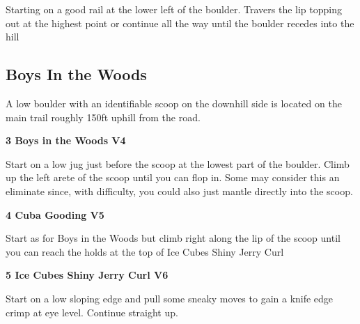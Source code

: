 \begin{multicols}{2}
\begin{minipage}{\linewidth}
					\begin{adjustwidth}{0.5cm}{}				
					Starting on a good rail at the lower left of the boulder. Travers the lip topping out at the highest point or continue all the way until the boulder recedes into the hill
					\end{adjustwidth}
					\end{minipage}
			\subsection*{Boys In the Woods}\label{bf:Boys In the Woods}
			\begin{minipage}{\columnwidth}
			A low boulder with an identifiable scoop on the downhill side is located on the main trail roughly 150ft uphill from the road.
			\end{minipage}
			

					\begin{minipage}{\linewidth}	
					\label{rt:Boys in the Woods}
\colorbox{RoyalBlue!20}{
\parbox{0.95\textwidth}{
\textbf{
3 Boys in the Woods V4    
}
}
}

					\begin{adjustwidth}{0.5cm}{}				
					Start on a low jug just before the scoop at the lowest part of the boulder. Climb up the left arete of the scoop until you can flop in. Some may consider this an eliminate since, with difficulty, you could also just mantle directly into the scoop.
					\end{adjustwidth}
					\end{minipage}
					\begin{minipage}{\linewidth}	
					\label{rt:Cuba Gooding}
\colorbox{RoyalBlue!20}{
\parbox{0.95\textwidth}{
\textbf{
4 Cuba Gooding V5  
}
}
}

					\begin{adjustwidth}{0.5cm}{}				
					Start as for Boys in the Woods but climb right along the lip of the scoop until you can reach the holds at the top of Ice Cubes Shiny Jerry Curl
					\end{adjustwidth}
					\end{minipage}
					\begin{minipage}{\linewidth}	
					\label{rt:Ice Cubes Shiny Jerry Curl}
\colorbox{RoyalBlue!20}{
\parbox{0.95\textwidth}{
\textbf{
5 Ice Cubes Shiny Jerry Curl V6  
}
}
}

					\begin{adjustwidth}{0.5cm}{}				
					Start on a low sloping edge and pull some sneaky moves to gain a knife edge crimp at eye level. Continue straight up.
					\end{adjustwidth}
					\end{minipage}

\end{multicols}
